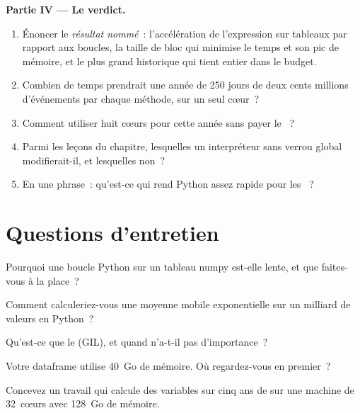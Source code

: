 \begin{problem}
\medskip\noindent\textbf{Partie IV --- Le verdict.}
\begin{enumerate}[resume]
\item Énoncer le \emph{résultat nommé}~: l'accélération de l'expression sur tableaux par rapport aux boucles, la taille de bloc qui minimise le temps et
son pic de mémoire, et le plus grand historique qui tient entier dans le budget.
\item Combien de temps prendrait une année de 250 jours de deux cents millions d'événements par chaque méthode, sur un seul cœur~?
\item Comment utiliser huit cœurs pour cette année sans payer le ~?
\item Parmi les leçons du chapitre, lesquelles un interpréteur sans verrou global modifierait-il, et lesquelles non~?
\item En une phrase~: qu'est-ce qui rend Python assez rapide pour les ~?
\end{enumerate}
\end{problem}

\section{Questions d'entretien}

\begin{interviewq}\label{iq:pl:python-at-scale:1}
Pourquoi une boucle Python sur un tableau numpy est-elle lente, et que faites-vous à la place~?
\end{interviewq}

\begin{interviewq}\label{iq:pl:python-at-scale:2}
Comment calculeriez-vous une moyenne mobile exponentielle sur un milliard de valeurs en Python~?
\end{interviewq}

\begin{interviewq}\label{iq:pl:python-at-scale:3}
Qu'est-ce que le  (GIL), et quand n'a-t-il pas d'importance~?
\end{interviewq}

\begin{interviewq}\label{iq:pl:python-at-scale:4}
Votre dataframe utilise 40~Go de mémoire. Où regardez-vous en premier~?
\end{interviewq}

\begin{interviewq}\label{iq:pl:python-at-scale:5}
Concevez un travail qui calcule des variables sur cinq ans de  sur une machine de 32~cœurs avec 128~Go de mémoire.
\end{interviewq}
